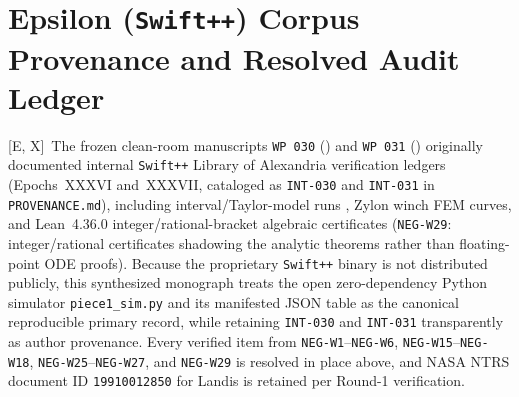 \documentclass[11pt]{amsart}
\numberwithin{equation}{section}
\theoremstyle{plain}
\theoremstyle{definition}\newtheorem{definition}[theorem]{Definition}
\theoremstyle{remark}\newtheorem{remark}[theorem]{Remark}
\newcommand{\ctag}[1]{\textup{\textsf{\scriptsize[#1]}}}
\begin{document}
\section{Epsilon (\texttt{Swift++}) Corpus Provenance and Resolved Audit Ledger}\label{app:provenance}
\ctag{E, X}\ The frozen clean-room manuscripts \texttt{WP~030} () and \texttt{WP~031} () originally documented internal \texttt{Swift++} Library of Alexandria verification ledgers (Epochs~XXXVI and~XXXVII, cataloged as \texttt{INT-030} and \texttt{INT-031} in \texttt{PROVENANCE.md}), including interval/Taylor-model runs \cite{moore1966,krawczyk1969,makino2003}, Zylon winch FEM curves, and Lean~4.36.0 integer/rational-bracket algebraic certificates (\texttt{NEG-W29}: integer/rational certificates shadowing the analytic theorems rather than floating-point ODE proofs). Because the proprietary \texttt{Swift++} binary is not distributed publicly, this synthesized monograph treats the open zero-dependency Python simulator \texttt{piece1\_sim.py} and its manifested JSON table as the canonical reproducible primary record, while retaining \texttt{INT-030} and \texttt{INT-031} transparently as author provenance. Every verified item from \texttt{NEG-W1}--\texttt{NEG-W6}, \texttt{NEG-W15}--\texttt{NEG-W18}, \texttt{NEG-W25}--\texttt{NEG-W27}, and \texttt{NEG-W29} is resolved in place above, and NASA NTRS document ID \texttt{19910012850} for Landis \cite{landis1990} is retained per Round-1 verification.



\end{document}

